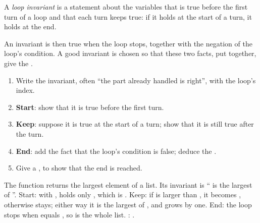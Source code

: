 \begin{definition}\label{def:g11:proving-algorithms-correct:invariant}
A \emph{loop invariant} is a statement about the variables that is true before the first
turn of a loop and that each turn keeps true: if it holds at the start of a turn, it holds at the end.
\end{definition}

An invariant is then true when the loop stops, together with the negation of the loop's condition. A good invariant is
chosen so that these two facts, put together, give the .

\begin{method}
\begin{enumerate}
  \item Write the invariant, often ``the part already handled is right'', with the loop's index.
  \item \textbf{Start}: show that it is true before the first turn.
  \item \textbf{Keep}: suppose it is true at the start of a turn; show that it is still true after the turn.
  \item \textbf{End}: add the fact that the loop's condition is false; deduce the .
  \item Give a , to show that the end is reached.
\end{enumerate}
\end{method}

The function  returns the largest element of a list. Its invariant is `` is the largest of
''. Start: with ,  holds only , which is . Keep: if
 is larger than , it becomes , otherwise  stays; either way it is the
largest of , and  grows by one. End: the loop stops when  equals , so
 is the whole list. : .

\label{lst:g11:proving-algorithms-correct:largest}

\label{out:g11:proving-algorithms-correct:largest}


